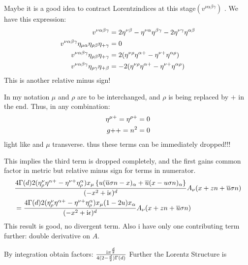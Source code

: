 Maybe it is a good idea to contract Lorentzindices at this stage$(v^{\nu\alpha\beta\gamma})$ . We have this expression: 
\begin{align}
	v^{\nu\alpha\beta\gamma} 
	&=
	2\eta^{\nu \beta}-\eta^{\nu \alpha}\eta^{\beta \gamma} -2\eta^{\nu \gamma} \eta^{\alpha\beta}
	\\
	v^{\nu\alpha\beta\gamma}\eta_{\mu\alpha}\eta_{\rho\beta}\eta_{+\gamma}
	&=
	0
	\\
	v^{\nu\alpha\beta\gamma}\eta_{\rho\beta}\eta_{+\gamma}
	&=
	2(\eta^{\nu \rho} \eta^{\alpha+} - \eta^{\nu +}\eta^{\alpha\rho})
	\\
	v^{\nu\alpha\beta\gamma}\eta_{\rho\gamma}\eta_{+\beta}
	&=
	-2(\eta^{\nu \rho} \eta^{\alpha+} - \eta^{\nu +}\eta^{\alpha\rho})
\end{align}
This is another relative minus sign!

In my notation $\mu $ and $\rho$ are to be interchanged, and $\rho$ is being replaced by $+$ in the end. Thus, in any combination: 
\begin{align}
	\eta^{\mu +} = \eta^{\rho +} = 0
	\\
	g{++}=n^2=0
\end{align}
light like and $\mu$ transverse. thus these terms can be immediately dropped!!!


This implies the third term is dropped completely, and the first gains common factor in metric but relative minus sign for terms in numerator. 
\begin{align}
	&\frac{4\Gamma(d)2(\eta^{\nu}_\rho \eta^{\alpha + } - \eta^{\nu +} \eta^{\alpha}_\rho) x_\mu\left\{u (\overline u \sigma n -x )_\alpha  +\overline u (x - u\sigma n)_\alpha  \right\}}{(-x^2+\text{i}\epsilon)^{d}} A_{\nu}(x+zn+\overline u \sigma n)
	\\
	&=
	\frac{4\Gamma(d)2(\eta^{\nu}_\rho \eta^{\alpha + } - \eta^{\nu +} \eta^{\alpha}_\rho) x_\mu(1-2u) x_\alpha }{(-x^2+\text{i}\epsilon)^{d}} A_{\nu}(x+zn+\overline u \sigma n)
\end{align}
This result is good, no divergent term. Also i have only one contributing term further: double derivative on $A$. 

By integration obtain factors: $\frac{\text{i} \pi^{\frac{d}{2}}}{4(2-\frac{d}{2})\Gamma(d)}$
Further the Lorentz Structure is

